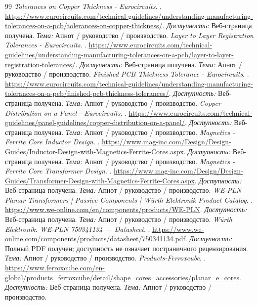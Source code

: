 \documentclass[14pt,a4paper]{extarticle}
\begin{document}
\begin{thebibliography}{99}
\textit{Tolerances on Copper Thickness - Eurocircuits}. .
\url{https://www.eurocircuits.com/technical-guidelines/understanding-manufacturing-tolerances-on-a-pcb/tolerances-on-copper-thickness/}.
\textit{Доступность:} Веб-страница получена. \textit{Тема:} Апнот / руководство / производство.
\textit{Layer to Layer Registration Tolerances - Eurocircuits}. .
\url{https://www.eurocircuits.com/technical-guidelines/understanding-manufacturing-tolerances-on-a-pcb/layer-to-layer-registration-tolerances/}.
\textit{Доступность:} Веб-страница получена. \textit{Тема:} Апнот / руководство / производство.
\textit{Finished PCB Thickness Tolerance - Eurocircuits}. .
\url{https://www.eurocircuits.com/technical-guidelines/understanding-manufacturing-tolerances-on-a-pcb/finished-pcb-thickness-tolerances/}.
\textit{Доступность:} Веб-страница получена. \textit{Тема:} Апнот / руководство / производство.
\textit{Copper Distribution on a Panel - Eurocircuits}. .
\url{https://www.eurocircuits.com/technical-guidelines/panel-guidelines/copper-distribution-on-a-panel/}.
\textit{Доступность:} Веб-страница получена. \textit{Тема:} Апнот / руководство / производство.
\textit{Magnetics - Ferrite Core Inductor Design}. .
\url{https://www.mag-inc.com/Design/Design-Guides/Inductor-Design-with-Magnetics-Ferrite-Cores.aspx}.
\textit{Доступность:} Веб-страница получена. \textit{Тема:} Апнот / руководство / производство.
\textit{Magnetics - Ferrite Core Transformer Design}. .
\url{https://www.mag-inc.com/Design/Design-Guides/Transformer-Design-with-Magnetics-Ferrite-Cores.aspx}.
\textit{Доступность:} Веб-страница получена. \textit{Тема:} Апнот / руководство / производство.
\textit{WE-PLN Planar Transformers | Passive Components | Würth Elektronik Product Catalog}. .
\url{https://www.we-online.com/en/components/products/WE-PLN}.
\textit{Доступность:} Веб-страница получена. \textit{Тема:} Апнот / руководство / производство.
\textit{Würth Elektronik. WE-PLN 750341134 — Datasheet}. .
\url{https://www.we-online.com/components/products/datasheet/750341134.pdf}.
\textit{Доступность:} Полный PDF получен; доступность не означает постраничного рецензирования. \textit{Тема:} Апнот / руководство / производство.
\textit{Products-Ferroxcube}. .
\url{https://www.ferroxcube.com/en-global/products_ferroxcube/detail/shape_cores_accessories/planar_e_cores}.
\textit{Доступность:} Веб-страница получена. \textit{Тема:} Апнот / руководство / производство.

\end{thebibliography}
\end{document}
